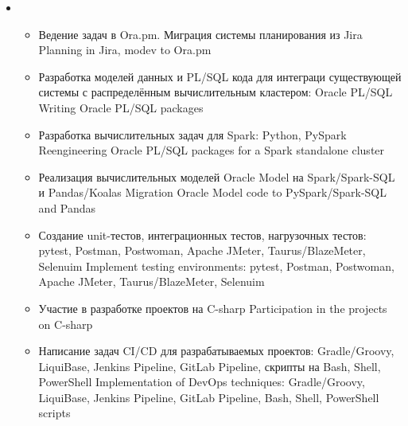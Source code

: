 \documentclass[11pt,a4paper,sans, russian]{moderncv}        %
\begin{document}
{\begin{itemize}
\begin{itemize}
				{Desing and implementation of Hadoop-based calculation cluster: Hadoop HDFS/YARN, ZooKeeper, Spark, Hive, Kyuubi Thrift JDBS/ODBC Server, Alluxio}
			\item {}
				{Проработка целевой архитектуры распределённой вычислительной системы с использованием различных стеков технологий}
				{Architecture desing for a distributed calculation subsystem to migrate from Oracle Model}
			\item {}
				{Проработка архитектуры прикладного программного обеспечения и взаимодействия компонент разрабатываемого решения}
				{System architecture desing for all software components of the projects}
			\item {}
				{Участие в технических совещаниях с заказчиком, участие в защите решения у заказчика, написание технической документации}
				{Participation in technical meetings with customers, writing technical documentation}
		\end{itemize}
		\item {}
		\begin{itemize}
			\item {}
				{Ведение задач в Ora.pm. Миграция системы планирования из Jira}
				{Planning in Jira, modev to Ora.pm}
			\item {}
				{Разработка моделей данных и PL/SQL кода для интеграци существующей системы с распределённым вычислительным кластером: Oracle PL/SQL}
				{Writing Oracle PL/SQL packages}
			\item {}
				{Разработка вычислительных задач для Spark: Python, PySpark}
				{Reengineering Oracle PL/SQL packages for a Spark standalone cluster}
			\item {}
				{Реализация вычислительных моделей Oracle Model на Spark/Spark-SQL и Pandas/Koalas}
				{Migration Oracle Model code to PySpark/Spark-SQL and Pandas}
			\item {}
				{Создание unit-тестов, интеграционных тестов, нагрузочных тестов: pytest, Postman, Postwoman, Apache JMeter, Taurus/BlazeMeter, Selenuim}
				{Implement testing environments: pytest, Postman, Postwoman, Apache JMeter, Taurus/BlazeMeter, Selenuim}
			\item {}
				{Участие в разработке проектов на C-sharp}
				{Participation in the projects on C-sharp}
			\item {}
				{Написание задач CI/CD для разрабатываемых проектов: Gradle/Groovy, LiquiBase, Jenkins Pipeline, GitLab Pipeline, скрипты на Bash, Shell, PowerShell}
				{Implementation of DevOps techniques: Gradle/Groovy, LiquiBase, Jenkins Pipeline, GitLab Pipeline, Bash, Shell, PowerShell scripts}	
		\end{itemize}
	\end{itemize}
}
\end{document}
